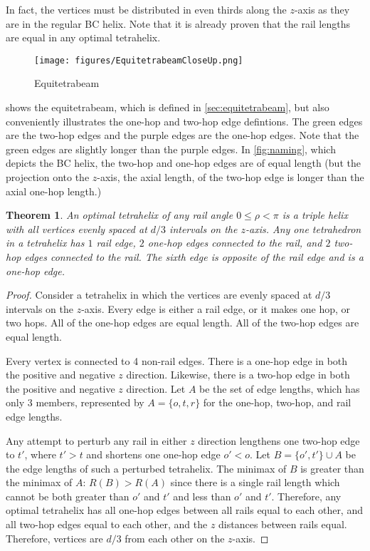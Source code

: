 \documentclass[10pt,final]{journals-1.0/asme2ej}
\newtheorem{theorem}{Theorem}
\begin{document}
In fact, the vertices must be distributed in even thirds
 along the $z$-axis as they are in the regular BC helix.
 Note that it is already proven that the rail
 lengths are equal in any optimal tetrahelix.

\begin{figure}
     \centering
     \texttt{[image: figures/EquitetrabeamCloseUp.png]}
     \caption{Equitetrabeam}
  \label{fig:equitetrabeam}
\end{figure}

 shows the equitetrabeam, which is defined in \cref{sec:equitetrabeam},
but also conveniently illustrates the one-hop and two-hop edge defintions.
The green edges are the two-hop edges and the purple edges are the one-hop edges. Note that the green
edges are slightly longer than the purple edges. In \cref{fig:naming}, which depicts the BC helix,
the two-hop and one-hop edges are of equal length (but the projection onto the $z$-axis, the
axial length, of the two-hop edge is longer than the axial one-hop length.)


\begin{theorem}
  \label{thm:eventhirds}
  An optimal tetrahelix of any rail angle $0 \leq \rho < \pi$ is a triple helix with all vertices evenly spaced at $d/3$ intervals on the $z$-axis.
  Any one tetrahedron in a tetrahelix has $1$ rail edge, $2$ one-hop edges connected to the rail, and $2$ two-hop edges connected to the rail.
  The sixth edge is opposite of the rail edge and is a one-hop edge.
\end{theorem}

\begin{proof}
    Consider a tetrahelix in which the vertices are evenly spaced at
    $d/3$ intervals on the $z$-axis. Every edge is either a rail edge,
    or it makes one hop, or two hops. All of the one-hop
    edges are equal length.  All of the two-hop edges are equal
    length.

    Every vertex is connected to 4 non-rail edges. There is a one-hop edge
    in both the positive and negative $z$ direction. Likewise, there is a two-hop
    edge in both the positive and negative $z$ direction. Let $A$ be the set
    of edge lengths, which has only 3 members, represented by $A = \{o,t,r\}$ for
    the one-hop, two-hop, and rail edge lengths.

    Any attempt to perturb any rail in either $z$ direction lengthens one two-hop edge to $t'$, where $t' > t$
    and shortens one one-hop edge $o' < o$. Let $B = \{o',t' \} \cup A$ be the edge lengths of such a
    perturbed tetrahelix.
    The minimax of $B$ is greater than the minimax of $A$: $R(B) > R(A) $ since there is a
    single rail length which cannot be both greater
    than $o'$ and $t'$ and less than $o'$ and $t'$.
    Therefore, any optimal tetrahelix has all one-hop edges between all rails equal to each other, and
    all two-hop edges equal to each other, and the $z$ distances between rails equal. Therefore, vertices are
    $d/3$ from each other on the $z$-axis.
\end{proof}
\end{document}
